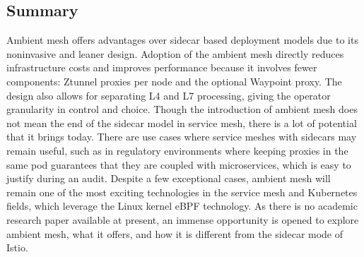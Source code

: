 \subsection{Summary}
Ambient mesh offers advantages over sidecar based deployment models due to its noninvasive and leaner design. Adoption of the ambient mesh directly reduces infrastructure costs and improves performance because it involves fewer components: Ztunnel proxies per node and the optional Waypoint proxy. The design also allows for separating L4 and L7 processing, giving the operator granularity in control and choice. Though the introduction of ambient mesh does not mean the end of the sidecar model in service mesh, there is a lot of potential that it brings today. There are use cases where service meshes with sidecars may remain useful, such as in regulatory environments where keeping proxies in the same pod guarantees that they are coupled with microservices, which is easy to justify during an audit. Despite a few exceptional cases, ambient mesh will remain one of the most exciting technologies in the service mesh and Kubernetes fields, which leverage the Linux kernel eBPF technology. As there is no academic research paper available at present, an immense opportunity is opened to explore ambient mesh, what it offers, and how it is different from the sidecar mode of Istio.
